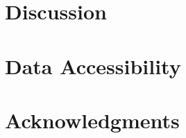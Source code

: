 \documentclass[12pt,titlepage]{article}
\begin{document}

\section{Discussion}



\section{Data Accessibility}



\section{Acknowledgments}




%

%
\end{document}

